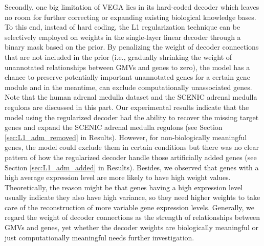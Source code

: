 Secondly, one big limitation of VEGA lies in its hard-coded decoder which leaves no room for further correcting or expanding existing biological knowledge bases\cite{Seninge2021}. To this end, instead of hard coding, the L1 regularization technique can be selectively employed on weights in the single-layer linear decoder through a binary mask based on the prior. By penalizing the weight of decoder connections that are not included in the prior (i.e., gradually shrinking the weight of unannotated relationships between GMVs and genes to zero), the model has a chance to preserve potentially important unannotated genes for a certain gene module and in the meantime, can exclude computationally unassociated genes. Note that the human adrenal medulla dataset\cite{Jansky2021} and the SCENIC adrenal medulla regulons\cite{Jansky2021} are discussed in this part. Our experimental results indicate that the model using the regularized decoder had the ability to recover the missing target genes and expand the SCENIC adrenal medulla regulons (see Section \ref{sec:L1_adm_removed} in Results). However, for non-biologically meaningful genes, the model could exclude them in certain conditions but there was no clear pattern of how the regularized decoder handle those artificially added genes (see Section \ref{sec:L1_adm_added} in Results). Besides, we observed that genes with a high average expression level are more likely to have high weight values. Theoretically, the reason might be that genes having a high expression level usually indicate they also have high variance, so they need higher weights to take care of the reconstruction of more variable gene expression levels. Generally, we regard the weight of decoder connections as the strength of relationships between GMVs and genes, yet whether the decoder weights are biologically meaningful or just computationally meaningful needs further investigation.

